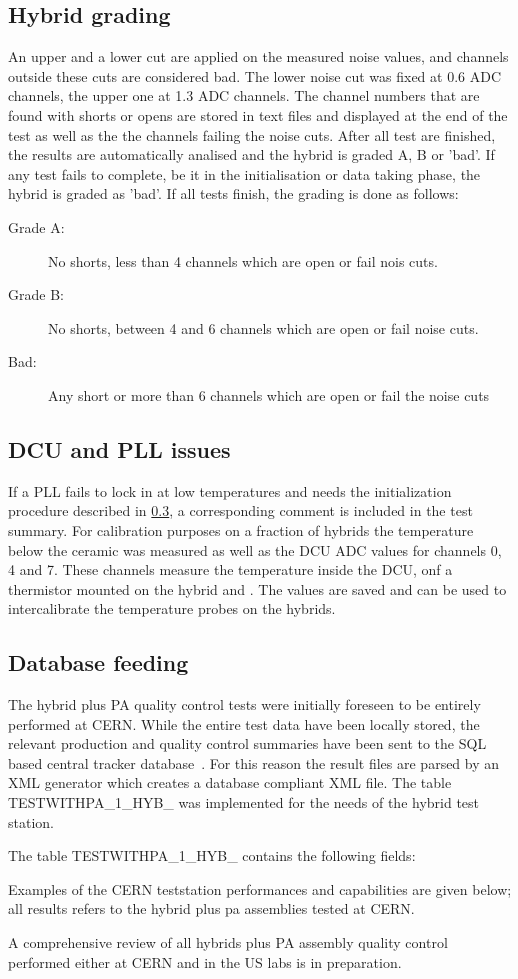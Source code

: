 \subsection{Hybrid grading}
An upper and a lower cut are applied on the measured noise values, and channels outside these cuts are considered bad.
The lower noise cut was fixed at 0.6 ADC channels, the upper one at 1.3 ADC channels.
The channel numbers that are found with shorts or opens are stored in text files and displayed at the end of the test as well as the the channels failing the noise cuts.
After all test are finished, the results are automatically analised and the hybrid is graded A, B or 'bad'.
If any test fails to complete, be it in the initialisation or data taking phase, the hybrid is graded as 'bad'.
If all tests finish, the grading is done as follows:
\begin{description}
\item[Grade A:] No shorts, less than 4 channels which are open or fail nois cuts.
\item[Grade B:] No shorts, between 4 and 6 channels which are open or fail noise cuts.
\item[Bad:] Any short or more than 6 channels which are open or fail the noise cuts
\end{description}

\subsection{DCU and PLL issues}
If a PLL fails to lock in at low temperatures and needs the initialization procedure described in \ref{}, a corresponding comment is included in the test summary.
For calibration purposes on a fraction of hybrids the temperature below the ceramic was measured as well as the DCU ADC values for channels 0, 4 and 7. These channels measure the temperature inside the DCU, onf a thermistor mounted on the hybrid and \fixme. The values are saved and can be used to intercalibrate the temperature probes on the hybrids.

\subsection{Database feeding}
The hybrid plus PA quality control tests were initially foreseen to be entirely performed at CERN.
While the entire test data have been locally stored, the relevant production and quality control summaries have been sent to the SQL based central tracker database~\cite{db}. For this reason the result files are parsed by an XML generator which creates a database compliant XML file. The table TESTWITHPA\_1\_HYB\_ was implemented for the needs of the hybrid test station.

The table TESTWITHPA\_1\_HYB\_ contains the following fields:


Examples of the CERN teststation performances and capabilities are given below; all results refers to the hybrid plus pa assemblies tested at CERN.

{\fixme} A comprehensive review of all hybrids plus PA assembly quality control performed either at CERN and in the US labs is in preparation.

